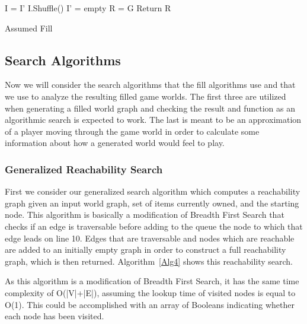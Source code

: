 \documentclass{ieeeaccess}
\begin{document}
\begin{algorithm}
\label{Alg3}
\SetAlgoLined
{}
    I = I'\;
    I.Shuffle()\;
    I' = empty\;
    R = G\;
    Return R\;
 \caption{Assumed Fill}
\end{algorithm}

\subsection{Search Algorithms}

Now we will consider the search algorithms that the fill algorithms use and that we use to
analyze the resulting filled game worlds. 
The first three are utilized when generating a filled world graph and checking the result and
function as an algorithmic search is expected to work. The last is meant to be an approximation
of a player moving through the game world in order to calculate some information about how a
generated world would feel to play.

\subsubsection{Generalized Reachability Search}

First we consider our generalized search algorithm which computes a reachability graph given an
input world graph, set of items currently owned, and the starting node. This algorithm is
basically a modification of Breadth First Search that checks if an edge is traversable before
adding to the queue the node to which that edge leads on line 10. Edges that are traversable and nodes
which are reachable are added to an initially empty graph in order to construct a full
reachability graph, which is then returned. Algorithm~\ref{Alg4} shows this reachability search.

As this algorithm is a modification of Breadth First Search, it has the same time complexity of
O(|V|+|E|), assuming the lookup time of visited nodes is equal to O(1). 
This could be accomplished with an array of Booleans indicating whether each node has been visited.
\end{document}
